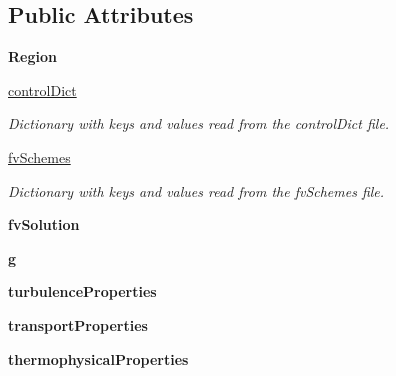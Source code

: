 \subsection*{Public Attributes}
\begin{DoxyCompactItemize}
\item 
\mbox{\label{classpy_f_v_m_1_1_foam_dictionaries_1_1_foam_dictionaries_a4e1a44df10b9d5d818a8082d29074f5e}} 
{\bfseries Region}
\item 
\mbox{\hyperlink{classpy_f_v_m_1_1_foam_dictionaries_1_1_foam_dictionaries_adebfb1a5f1e0985c3649a957ef8ce443}{control\+Dict}}
\begin{DoxyCompactList}\small\item\em Dictionary with keys and values read from the \textquotesingle{}control\+Dict\textquotesingle{} file. \end{DoxyCompactList}\item 
\mbox{\hyperlink{classpy_f_v_m_1_1_foam_dictionaries_1_1_foam_dictionaries_acc8665199addb6c6c34bab84b759ad9d}{fv\+Schemes}}
\begin{DoxyCompactList}\small\item\em Dictionary with keys and values read from the \textquotesingle{}fv\+Schemes\textquotesingle{} file. \end{DoxyCompactList}\item 
\mbox{\label{classpy_f_v_m_1_1_foam_dictionaries_1_1_foam_dictionaries_a4f6ee97ea328cbf2dbe2835b0d1258cc}} 
{\bfseries fv\+Solution}
\item 
\mbox{\label{classpy_f_v_m_1_1_foam_dictionaries_1_1_foam_dictionaries_a3288ba1ed96c1fd1e56491f361c3264d}} 
{\bfseries g}
\item 
\mbox{\label{classpy_f_v_m_1_1_foam_dictionaries_1_1_foam_dictionaries_a9761b7abfaabde980fa972da8bd5199d}} 
{\bfseries turbulence\+Properties}
\item 
\mbox{\label{classpy_f_v_m_1_1_foam_dictionaries_1_1_foam_dictionaries_a50d9298fbe40db74be605a96d89e2dff}} 
{\bfseries transport\+Properties}
\item 
\mbox{\label{classpy_f_v_m_1_1_foam_dictionaries_1_1_foam_dictionaries_ab6547aef6ec625bee14b5585233c3f83}} 
{\bfseries thermophysical\+Properties}
\end{DoxyCompactItemize}
